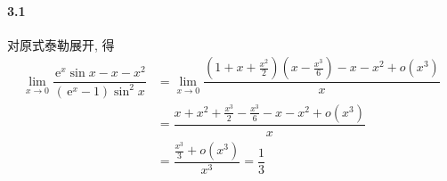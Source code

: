 \paragraph*{3.1} 

对原式泰勒展开, 得
\[
	\begin{aligned}
\lim_{x\to 0}\dfrac{\,\mathrm{e}^{x}\sin x-x-x^2}{\left(\,\mathrm{e}^x-1\right)\sin^2 x}&=\lim_{x\to 0}\dfrac{\left(1+x+\frac{x^2}{2}\right)(x-\frac{x^3}{6})-x-x^2+o\left(x^3\right)}{x}\\
&=\dfrac{x+x^2+\frac{x^3}{2}-\frac{x^3}{6}-x-x^2+o\left(x^3\right)}{x}\\
&=\dfrac{\frac{x^3}{3}+o\left(x^3\right)}{x^3}=\dfrac{1}{3}
	\end{aligned}
\]